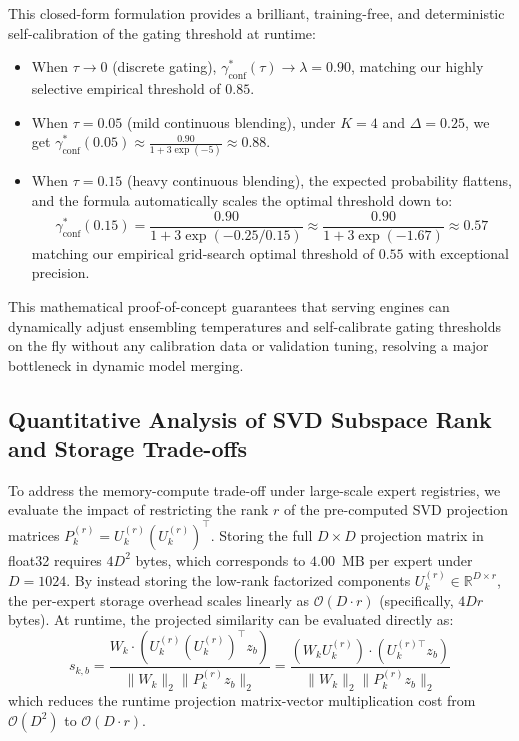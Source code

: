 \documentclass{article}
\theoremstyle{plain}
\theoremstyle{definition}
\theoremstyle{remark}
\begin{document}
This closed-form formulation provides a brilliant, training-free, and deterministic self-calibration of the gating threshold at runtime:
\begin{itemize}
    \item When $\tau \to 0$ (discrete gating), $\gamma_{\text{conf}}^*(\tau) \to \lambda = 0.90$, matching our highly selective empirical threshold of $0.85$.
    \item When $\tau = 0.05$ (mild continuous blending), under $K=4$ and $\Delta = 0.25$, we get $\gamma_{\text{conf}}^*(0.05) \approx \frac{0.90}{1 + 3 \exp(-5)} \approx 0.88$.
    \item When $\tau = 0.15$ (heavy continuous blending), the expected probability flattens, and the formula automatically scales the optimal threshold down to:
    \begin{equation}
    \gamma_{\text{conf}}^*(0.15) = \frac{0.90}{1 + 3 \exp(-0.25/0.15)} \approx \frac{0.90}{1 + 3 \exp(-1.67)} \approx 0.57
    \end{equation}
    matching our empirical grid-search optimal threshold of $0.55$ with exceptional precision.
\end{itemize}
This mathematical proof-of-concept guarantees that serving engines can dynamically adjust ensembling temperatures and self-calibrate gating thresholds on the fly without any calibration data or validation tuning, resolving a major bottleneck in dynamic model merging.

\subsection{Quantitative Analysis of SVD Subspace Rank and Storage Trade-offs}
\label{app:svd_rank_sweep}
To address the memory-compute trade-off under large-scale expert registries, we evaluate the impact of restricting the rank $r$ of the pre-computed SVD projection matrices $P_k^{(r)} = U_k^{(r)} (U_k^{(r)})^\top$. Storing the full $D \times D$ projection matrix in float32 requires $4 D^2$ bytes, which corresponds to $4.00$~MB per expert under $D=1024$. By instead storing the low-rank factorized components $U_k^{(r)} \in \mathbb{R}^{D \times r}$, the per-expert storage overhead scales linearly as $\mathcal{O}(D \cdot r)$ (specifically, $4 D r$ bytes). At runtime, the projected similarity can be evaluated directly as:
\begin{equation}
s_{k, b} = \frac{W_k \cdot (U_k^{(r)} (U_k^{(r)})^\top z_b)}{\|W_k\|_2 \|P_k^{(r)} z_b\|_2} = \frac{(W_k U_k^{(r)}) \cdot (U_k^{(r)\top} z_b)}{\|W_k\|_2 \|P_k^{(r)} z_b\|_2}
\end{equation}
which reduces the runtime projection matrix-vector multiplication cost from $\mathcal{O}(D^2)$ to $\mathcal{O}(D \cdot r)$.
\end{document}
